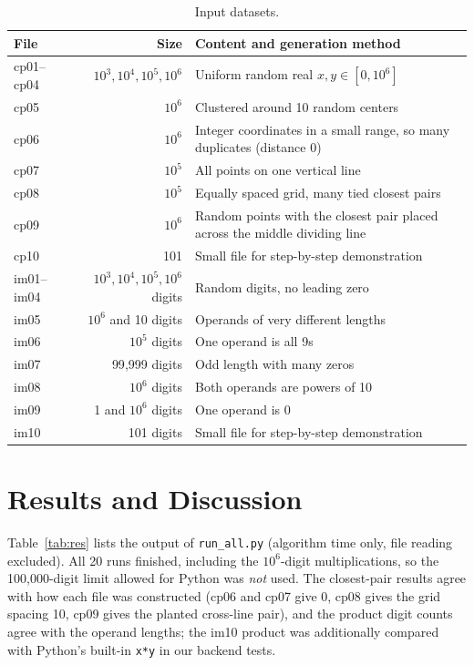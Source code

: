 \documentclass[10pt,a4paper]{article}
\begin{document}
\begin{table}[h]
\centering\small
\caption{Input datasets.}\label{tab:data}
\begin{tabular}{@{}l r p{9.6cm}@{}}
\toprule
File & Size & Content and generation method\\
\midrule
cp01--cp04 & $10^3,10^4,10^5,10^6$ & Uniform random real $x,y\in[0,10^6]$\\
cp05 & $10^6$ & Clustered around 10 random centers\\
cp06 & $10^6$ & Integer coordinates in a small range, so many duplicates (distance 0)\\
cp07 & $10^5$ & All points on one vertical line\\
cp08 & $10^5$ & Equally spaced grid, many tied closest pairs\\
cp09 & $10^6$ & Random points with the closest pair placed across the middle dividing line\\
cp10 & 101 & Small file for step-by-step demonstration\\
\midrule
im01--im04 & $10^3,10^4,10^5,10^6$ digits & Random digits, no leading zero\\
im05 & $10^6$ and 10 digits & Operands of very different lengths\\
im06 & $10^5$ digits & One operand is all 9s\\
im07 & 99{,}999 digits & Odd length with many zeros\\
im08 & $10^6$ digits & Both operands are powers of 10\\
im09 & 1 and $10^6$ digits & One operand is 0\\
im10 & 101 digits & Small file for step-by-step demonstration\\
\bottomrule
\end{tabular}
\end{table}

\section{Results and Discussion}
Table~\ref{tab:res} lists the output of \texttt{run\_all.py} (algorithm time only, file reading excluded). All 20 runs finished, including the $10^6$-digit multiplications, so the 100{,}000-digit limit allowed for Python was \emph{not} used. The closest-pair results agree with how each file was constructed (cp06 and cp07 give 0, cp08 gives the grid spacing 10, cp09 gives the planted cross-line pair), and the product digit counts agree with the operand lengths; the im10 product was additionally compared with Python's built-in \texttt{x*y} in our backend tests.
\end{document}
